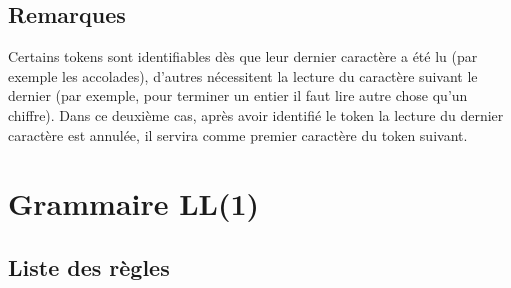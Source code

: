\documentclass[a4paper,10pt]{article}
\begin{document}
	\subsection{Remarques}
		Certains tokens sont identifiables dès que leur dernier caractère a été lu (par exemple les accolades), 
		d'autres nécessitent la lecture du caractère suivant le dernier (par exemple, pour terminer un entier il faut lire autre chose qu'un chiffre).
		Dans ce deuxième cas, après avoir identifié le token la lecture du dernier caractère est annulée, il servira comme premier caractère du token suivant.

\section{Grammaire LL(1)}

\setcounter{cnt}{1}

\newcommand{\varname}[1]{\begin{math}\langle\end{math}#1\begin{math}\rangle\end{math}}
\newcommand{\num}{\begin{math}[\thecnt]\end{math}\addtocounter{cnt}{1}}

\subsection{Liste des règles}
\end{document}
